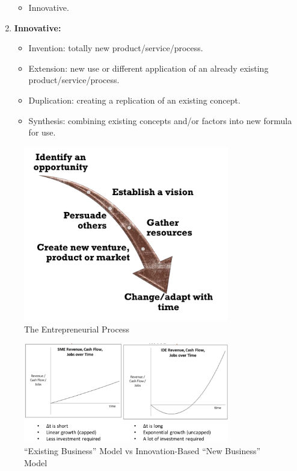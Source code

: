 \documentclass[a4paper,11pt]{article}
\begin{document}
\begin{enumerate}
\begin{itemize}
                \item   Innovative.
            \end{itemize}
    \item   \textbf{Innovative:}
            \begin{itemize}
                \item   Invention: totally new product/service/process.
                \item   Extension: new use or different application of an already existing product/service/process.
                \item   Duplication: creating a replication of an existing concept.
                \item   Synthesis: combining existing concepts and/or factors into new formula for use.
            \end{itemize}
\end{enumerate}

\begin{figure}[H]
    \centering
    \includegraphics[width=0.8\textwidth]{images/entrepreneurial_process.png}
    \caption{The Entrepreneurial Process}
\end{figure}

\begin{figure}[H]
    \centering
    \includegraphics[width=0.8\textwidth]{images/existing_vs_innovation.png}
    \caption{``Existing Business'' Model vs Innovation-Based ``New Business'' Model}
\end{figure}
\end{document}
